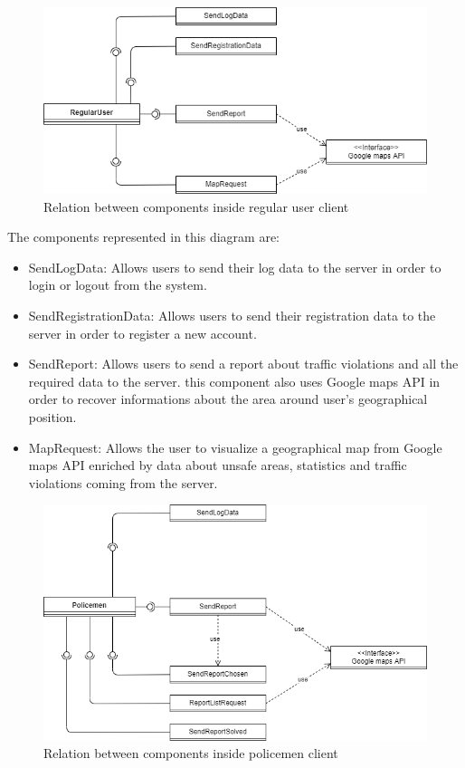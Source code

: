 \begin{figure}[h!]
	\centering
	\includegraphics[scale=0.7]{Images/RegularUserClient}
	\caption{Relation between components inside regular user client}
\end{figure}
The components represented in this diagram are:
\begin{itemize}
	\item SendLogData: Allows users to send their log data to the server in order to login or logout from the system.
	\item SendRegistrationData: Allows users to send  their registration data to the server in order to register a new account.
	\item SendReport: Allows users to send a report about traffic violations and all the required data to the server.
	this component also uses Google maps API in order to recover informations about the area around user's geographical position.
	\item MapRequest: Allows the user to visualize a geographical map from Google maps API enriched by data about unsafe areas, statistics and traffic violations coming from the server.
\end{itemize}
\newpage
\begin{figure}[h!]
	\centering
	\includegraphics[scale=0.7]{Images/PolicemenClient}
	\caption{Relation between components inside policemen client}
\end{figure}
